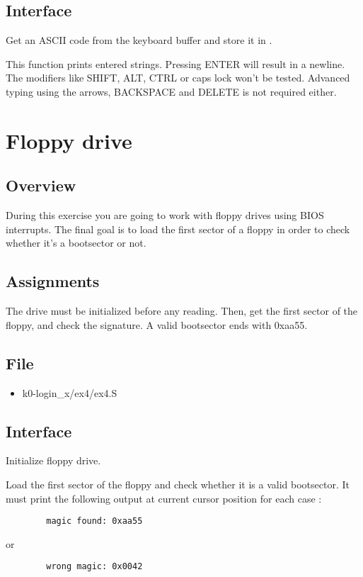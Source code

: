 \subsection*{Interface}
{
  Get an ASCII code from the keyboard buffer and store it in .
}

{
  This function prints entered strings. Pressing ENTER will result in a
  newline.
  The modifiers like SHIFT, ALT, CTRL or caps lock won't be tested. Advanced
  typing using the arrows, BACKSPACE and DELETE is not required either.
}

%
%

\newpage

\section{Floppy drive}

\subsection*{Overview}
During this exercise you are going to work with floppy drives using BIOS
interrupts. The final goal is to load the first sector of a floppy in order
to check whether it's a bootsector or not.

\subsection*{Assignments}
The drive must be initialized before any reading. Then, get the first sector of
the floppy, and check the signature. A valid bootsector ends with 0xaa55.

\subsection*{File}
\begin{itemize}
  \item k0-login\_x/ex4/ex4.S
\end{itemize}

\subsection*{Interface}
{
  Initialize floppy drive.
}

{
  Load the first sector of the floppy and check whether it is a valid
  bootsector. It must print the following output at current cursor
  position for each case :
}
\begin{verbatim}
        magic found: 0xaa55
\end{verbatim}
\function{}{} {
or
}
\begin{verbatim}
        wrong magic: 0x0042
\end{verbatim}



